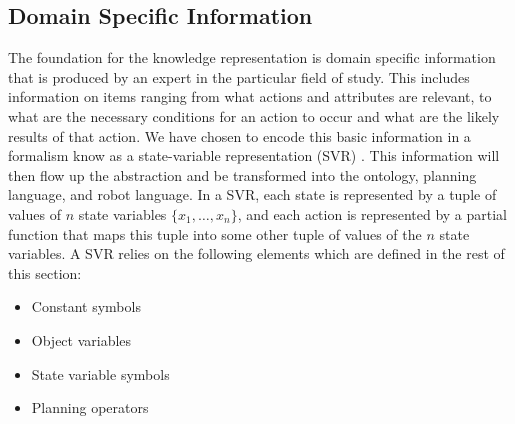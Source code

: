 \documentclass[a4paper, 10pt, conference]{ieeeconf}      %
\begin{document}
\subsection{Domain Specific Information}
The foundation for the knowledge representation is domain specific information that is produced by an expert in the particular field of study. This includes
information on items ranging from what actions and attributes are relevant, to what are the necessary conditions for an action to occur and what are the
likely results of that action. We have chosen to encode this basic information in a formalism know as a state-variable representation (SVR) \cite{NAU.2004}.
This information will then flow up the abstraction and be transformed into the ontology, planning language, and robot language.
In a SVR, each state is represented by a tuple of values of $n$ state variables $\lbrace x_1,\dots,x_n\rbrace$, and each action is represented by a partial function that maps this tuple into some other tuple of values of the $n$ state variables. A SVR relies on the following elements which are defined in the rest of this section:
\begin{itemize}
  \item Constant symbols
  \item Object variables
  \item State variable symbols
  \item Planning operators
\end{itemize}
\end{document}

